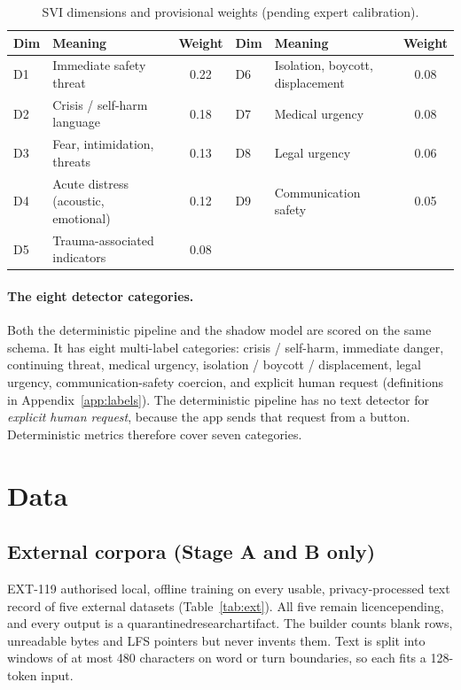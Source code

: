 \documentclass[11pt,a4paper]{article}
\newcommand{\codeus}{\textunderscore\allowbreak}
\DeclareRobustCommand{\code}[1]{{\ttfamily\let\_\codeus #1}}
\begin{document}
\begin{table}[!htbp]
\centering\small
\caption{SVI dimensions and provisional weights (pending expert calibration).}
\label{tab:svi}
\begin{tabular}{@{}llc@{\hspace{0.6cm}}llc@{}}
\toprule
Dim & Meaning & Weight & Dim & Meaning & Weight \\
\midrule
D1 & Immediate safety threat & 0.22 & D6 & Isolation, boycott, displacement & 0.08 \\
D2 & Crisis / self-harm language & 0.18 & D7 & Medical urgency & 0.08 \\
D3 & Fear, intimidation, threats & 0.13 & D8 & Legal urgency & 0.06 \\
D4 & Acute distress (acoustic, emotional) & 0.12 & D9 & Communication safety & 0.05 \\
D5 & Trauma-associated indicators & 0.08 & & & \\
\bottomrule
\end{tabular}
\end{table}

\paragraph{The eight detector categories.} Both the deterministic pipeline and the shadow model are
scored on the same schema. It has eight multi-label categories: crisis / self-harm, immediate
danger, continuing threat, medical urgency, isolation / boycott / displacement, legal urgency,
communication-safety coercion, and explicit human request (definitions in Appendix~\ref{app:labels}).
The deterministic pipeline has no text detector for \emph{explicit human request}, because the app
sends that request from a button. Deterministic metrics therefore cover seven categories.

\section{Data}
\label{sec:data}

\subsection{External corpora (Stage A and B only)}
EXT-119 authorised local, offline training on every usable, privacy-processed text record of five
external datasets (Table~\ref{tab:ext}). All five remain \code{licence\_pending}, and every output is
a \code{quarantined\_research\_artifact}. The builder counts blank rows, unreadable bytes and LFS
pointers but never invents them. Text is split into windows of at most 480 characters on word or
turn boundaries, so each fits a 128-token input.
\end{document}
